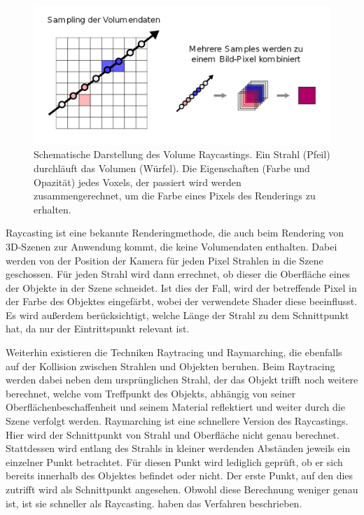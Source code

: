\begin{figure}[!htb]
	\centering
	\includegraphics[width=0.7\linewidth]{images/rayCasting.png}
	\caption{Schematische Darstellung des Volume Raycastings. Ein Strahl (Pfeil) durchläuft das Volumen (Würfel). Die Eigenschaften (Farbe und Opazität) jedes Voxels, der passiert wird werden zusammengerechnet, um die Farbe eines Pixels des Renderings zu erhalten.}
	\label{img:rayCasting}
\end{figure}
\FloatBarrier

Raycasting ist eine bekannte Renderingmethode, die auch beim Rendering von 3D-Szenen zur Anwendung kommt, die keine Volumendaten enthalten.
Dabei werden von der Position der Kamera für jeden Pixel Strahlen in die Szene geschossen. Für jeden Strahl wird dann errechnet, ob dieser die Oberfläche eines der Objekte in der Szene schneidet. Ist dies der Fall, wird der betreffende Pixel in der Farbe des Objektes eingefärbt, wobei der verwendete Shader diese beeinflusst. Es wird außerdem berücksichtigt, welche Länge der Strahl zu dem Schnittpunkt hat, da nur der Eintrittspunkt relevant ist.

Weiterhin existieren die Techniken Raytracing und Raymarching, die ebenfalls auf der Kollision zwischen Strahlen und Objekten beruhen.
Beim Raytracing werden dabei neben dem ursprünglichen Strahl, der das Objekt trifft noch weitere berechnet, welche vom Treffpunkt des Objekts, abhängig von seiner Oberflächenbeschaffenheit und seinem Material reflektiert und weiter durch die Szene verfolgt werden.
Raymarching ist eine schnellere Version des Raycastings. 
Hier wird der Schnittpunkt von Strahl und Oberfläche nicht genau berechnet. Stattdessen wird entlang des Strahls in kleiner werdenden Abständen jeweils ein einzelner Punkt betrachtet. Für diesen Punkt wird lediglich geprüft, ob er sich bereits innerhalb des Objektes befindet oder nicht. Der erste Punkt, auf den dies zutrifft wird als Schnittpunkt angesehen. Obwohl diese Berechnung weniger genau ist, ist sie schneller als Raycasting.
\cite{Hart89} haben das Verfahren beschrieben. 

